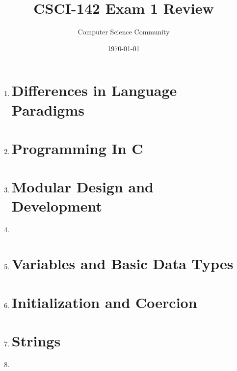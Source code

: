 \documentclass[11pt]{article}
\title{CSCI-142 Exam 1 Review}
\author{Computer Science Community}
\date{\today}
\begin{document}
\header

\begin{enumerate}

\section*{History and Evolution of Programming Languages}

	\item 

\section*{Differences in Language Paradigms}

	\item 

\section*{Programming In C}

	\item 

\newpage
\section*{Modular Design and Development}

	\item 
	\item 

\section*{Variables and Basic Data Types}

	\item 

\newpage
\section*{Initialization and Coercion}

	\item 

\section*{Strings}
	\item 


\end{enumerate}
\end{document}
